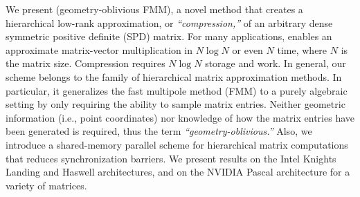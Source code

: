 We present \gofmm{} (geometry-oblivious FMM), a novel method that creates a
hierarchical low-rank approximation, or \emph{``compression,''} of an arbitrary
dense symmetric positive definite (SPD) matrix. For many applications, \gofmm{}
enables an approximate matrix-vector multiplication in $N \log N$ or even $N$
time, where $N$ is the matrix size. Compression requires $N \log N$ storage and
work.  In general, our scheme belongs to the family of hierarchical matrix
approximation methods. In particular, it generalizes the fast multipole method
(FMM) to a purely algebraic setting by only requiring the ability to sample
matrix entries. Neither geometric information (i.e., point coordinates) nor
knowledge of how the matrix entries have been generated is required,  thus the
term \emph{``geometry-oblivious.''} Also, we introduce a shared-memory parallel scheme for hierarchical matrix computations that reduces synchronization barriers. We present results on the Intel Knights Landing and Haswell architectures, and on the NVIDIA Pascal architecture for a variety of matrices.
